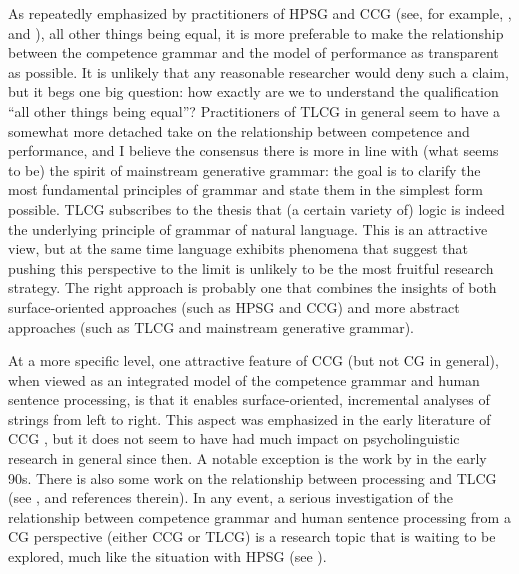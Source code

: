 \documentclass[output=paper
                ,modfonts
 	        ,biblatex
                ,babelshorthands
                ,newtxmath
                ,draftmode
                ,colorlinks, citecolor=brown
]{langscibook}
\begin{document}
As repeatedly emphasized by practitioners of HPSG and CCG (see, for
example, \citealt{SW2011a}, \citealt[Section 13.7]{steedman2012} and
), all other things being equal, it is more
preferable to make the relationship between the competence grammar and
the model of performance as transparent as possible. It is
unlikely that any reasonable
researcher would deny such a claim, but it begs one big question:
how exactly are we to understand the qualification ``all other things
being equal''? Practitioners of TLCG in general seem to have a somewhat more
detached take on the relationship between competence and performance, 
and I believe the consensus there is more in line with (what seems to be)
the spirit of mainstream generative grammar: the goal is to clarify
the most fundamental principles of grammar and state them in the
simplest form possible. TLCG subscribes to the thesis that (a certain
variety of) logic is indeed the underlying principle of grammar of
natural language. This is an attractive view, but at the same time
language exhibits phenomena that suggest that pushing this perspective
to the limit is unlikely to be the most fruitful research strategy. The
right approach is probably one that combines the insights of both 
surface-oriented approaches (such as HPSG and CCG) and more abstract
approaches (such as TLCG and mainstream generative grammar).

At a more specific level, one attractive feature of CCG (but not CG in
general), when viewed as an integrated model of the competence grammar
and human sentence processing, is that it enables surface-oriented,
incremental analyses of strings from left to right. This aspect was
emphasized in the early literature of CCG \citep{AS82a,CS85a}, but it
does not seem to have had much impact on psycholinguistic research in
general since then. A notable exception is the work by
\citet{pickering-barry91,PB93a} in the early 90s. There is also some work
on the relationship between processing and TLCG (see \citealt[Chapters 9 and 10]{morrill2011},
and references therein). In any event, a serious
investigation of the relationship between competence grammar and human
sentence processing from a CG perspective (either CCG or TLCG) is a
research topic that is waiting to be explored, much like the situation
with HPSG (see ).
\end{document}
